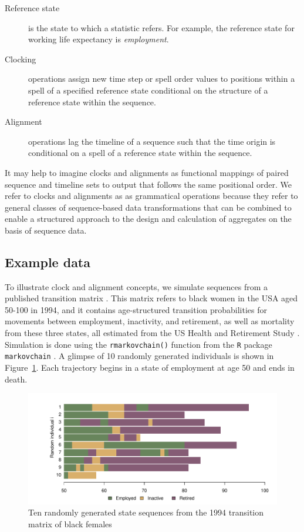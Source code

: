 \documentclass[a4paper,left=1.25cm,right=1.25cm,top=1.25cm,bottom=1.25cm]{article}
\begin{document}
\begin{description}
    \item[Reference state] is the state to which a statistic refers. For example, the reference state for working life expectancy is \emph{employment}.
    \item[Clocking] operations assign new time step or spell order values to positions within a spell of a specified reference state conditional on the structure of a reference state within the sequence.  
    \item[Alignment] operations lag the timeline of a sequence such that the time origin is conditional on a spell of a reference state within the sequence. 
\end{description}

It may help to imagine clocks and alignments as functional mappings of paired sequence and timeline sets to output that follows the same positional order. We refer to clocks and alignments as as grammatical operations because they refer to general classes of sequence-based data transformations that can be combined to enable a structured approach to the design and calculation of aggregates on the basis of sequence data.

\subsection{Example data}
To illustrate clock and alignment concepts, we simulate sequences from a published transition matrix \citep{Dudel2017}. This matrix refers to black women in the USA aged 50-100 in 1994, and it contains age-structured transition probabilities for movements between employment, inactivity, and retirement, as well as mortality from these three states, all estimated from the US Health and Retirement Study \citep{HRS}. Simulation is done using the \texttt{rmarkovchain()} function from the \texttt{R} package \texttt{markovchain} \citep{spedicato2017}. A glimpse of 10 randomly generated individuals is shown in Figure~\ref{fig:seq10}.  Each trajectory begins in a state of employment at age 50 and ends in death.

\begin{figure}[ht!]
\centering
\includegraphics[scale=.5]{Figures/Seq10.pdf}
\caption{Ten randomly generated state sequences from the 1994 transition matrix
of black females \citep{Dudel2017}}
\label{fig:seq10}
\end{figure}
\end{document}
